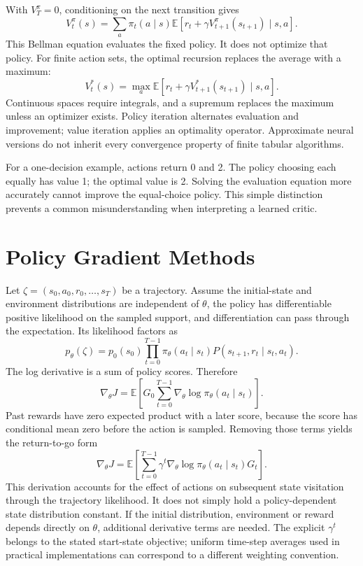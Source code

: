 With $V_T^\pi=0$, conditioning on the next transition gives
\begin{equation}
V_t^\pi(s)=\sum_a\pi_t(a\mid s)
\mathbb E[r_t+\gamma V_{t+1}^\pi(s_{t+1})\mid s,a].
\end{equation}
This Bellman equation evaluates the fixed policy. It does not optimize that policy. For finite action sets, the optimal recursion replaces the average with a maximum:
\begin{equation}
V_t^*(s)=\max_a\mathbb E[r_t+\gamma V_{t+1}^*(s_{t+1})\mid s,a].
\end{equation}
Continuous spaces require integrals, and a supremum replaces the maximum unless an optimizer exists. Policy iteration alternates evaluation and improvement; value iteration applies an optimality operator. Approximate neural versions do not inherit every convergence property of finite tabular algorithms.

For a one-decision example, actions return 0 and 2. The policy choosing each equally has value 1; the optimal value is 2. Solving the evaluation equation more accurately cannot improve the equal-choice policy. This simple distinction prevents a common misunderstanding when interpreting a learned critic.

\section{Policy Gradient Methods}

Let $\zeta=(s_0,a_0,r_0,\ldots,s_T)$ be a trajectory. Assume the initial-state and environment distributions are independent of $\theta$, the policy has differentiable positive likelihood on the sampled support, and differentiation can pass through the expectation. Its likelihood factors as
\begin{equation}
p_\theta(\zeta)=p_0(s_0)\prod_{t=0}^{T-1}
\pi_\theta(a_t\mid s_t)P(s_{t+1},r_t\mid s_t,a_t).
\end{equation}
The log derivative is a sum of policy scores. Therefore
\begin{equation}
\nabla_\theta J=
\mathbb E\left[G_0\sum_{t=0}^{T-1}\nabla_\theta\log\pi_\theta(a_t\mid s_t)\right].
\end{equation}
Past rewards have zero expected product with a later score, because the score has conditional mean zero before the action is sampled. Removing those terms yields the return-to-go form
\begin{equation}
\nabla_\theta J=
\mathbb E\left[\sum_{t=0}^{T-1}\gamma^t
\nabla_\theta\log\pi_\theta(a_t\mid s_t)G_t\right].
\end{equation}
This derivation accounts for the effect of actions on subsequent state visitation through the trajectory likelihood. It does not simply hold a policy-dependent state distribution constant. If the initial distribution, environment or reward depends directly on $\theta$, additional derivative terms are needed. The explicit $\gamma^t$ belongs to the stated start-state objective; uniform time-step averages used in practical implementations can correspond to a different weighting convention.

